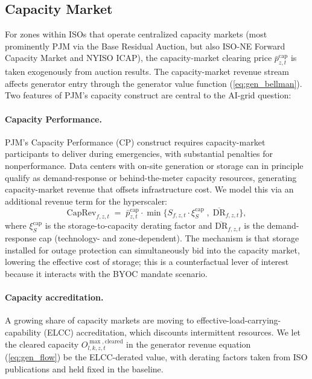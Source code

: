 \documentclass[12pt,letterpaper]{article}
\begin{document}
\subsection{Capacity Market}
\label{sec:cap_market}

For zones within ISOs that operate centralized capacity markets (most
prominently PJM via the Base Residual Auction, but also ISO-NE Forward
Capacity Market and NYISO ICAP), the capacity-market clearing price
$\bar p^{\text{cap}}_{z,t}$ is taken exogenously from auction results.
The capacity-market revenue stream affects generator entry through the
generator value function (\ref{eq:gen_bellman}). Two features of PJM's
capacity construct are central to the AI-grid question:

\paragraph{Capacity Performance.} PJM's Capacity Performance (CP) construct
requires capacity-market participants to deliver during emergencies, with
substantial penalties for nonperformance. Data centers with on-site
generation or storage can in principle qualify as demand-response or
behind-the-meter capacity resources, generating capacity-market revenue
that offsets infrastructure cost. We model this via an additional revenue
term for the hyperscaler:
\begin{equation}
\label{eq:hyper_cap_rev}
\text{CapRev}_{f,z,t} \;=\; \bar p^{\text{cap}}_{z,t} \cdot \min\big\{
S_{f,z,t} \cdot \xi^{\text{cap}}_{S} \;,\; \overline{\text{DR}}_{f,z,t}
\big\},
\end{equation}
where $\xi^{\text{cap}}_S$ is the storage-to-capacity derating factor and
$\overline{\text{DR}}_{f,z,t}$ is the demand-response cap (technology- and
zone-dependent). The mechanism is that storage installed for outage
protection can simultaneously bid into the capacity market, lowering the
effective cost of storage; this is a counterfactual lever of interest
because it interacts with the BYOC mandate scenario.

\paragraph{Capacity accreditation.} A growing share of capacity markets are
moving to effective-load-carrying-capability (ELCC) accreditation, which
discounts intermittent resources. We let the cleared capacity
$O^{\max,\text{cleared}}_{l,k,z,t}$ in the generator revenue equation
(\ref{eq:gen_flow}) be the ELCC-derated value, with derating factors taken
from ISO publications and held fixed in the baseline.
\end{document}
